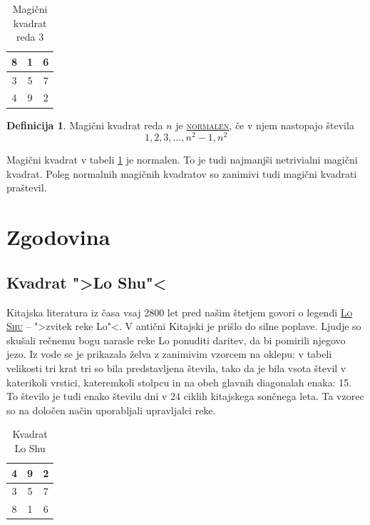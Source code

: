 \documentclass[a4paper,12pt]{article}
\newenvironment{magic}[3]
{
   \begin{table}[!ht]
      \centering
      \caption{#2}
      \label{#3}
      \large
      \begin{tabular}{#1}
         \hline 
}{
      \end{tabular}
      \normalsize
   \end{table}
}
\newcommand{\pojem}[1]{\underline{\textsc{#1}}}
\theoremstyle{definition}
\newtheorem{definicija}{Definicija}
\theoremstyle{definition}
\begin{document}
\begin{magic}{|c|c|c|}{Magični kvadrat reda 3}{MKreda3}
   8 & 1 & 6 \\\hline
   3 & 5 & 7 \\\hline
   4 & 9 & 2 \\\hline
\end{magic}

\begin{definicija}
   Magični kvadrat reda $ n $ je \pojem{normalen}, če v njem nastopajo števila
   \begin{equation}
      1,2,3,\dots,n^2 - 1,n^2
      \label{normalenKvad}
   \end{equation}
\end{definicija}

Magični kvadrat v tabeli \ref{MKreda3} je normalen.
To je tudi najmanjši netrivialni magični kvadrat.
Poleg normalnih magičnih kvadratov so zanimivi tudi magični kvadrati praštevil.


\section{Zgodovina}

\subsection{Kvadrat ">Lo Shu"<}

Kitajska literatura iz časa vsaj 2800 let pred našim štetjem govori o legendi
\pojem{Lo Shu} -- ">zvitek reke Lo"<. V antični Kitajski je prišlo do
silne poplave. Ljudje so skušali rečnemu bogu narasle reke Lo ponuditi daritev,
da bi pomirili njegovo jezo. Iz vode se je prikazala želva z zanimivim vzorcem
na oklepu: v tabeli velikosti tri krat tri so bila predstavljena števila, tako
da je bila vsota števil v katerikoli vrstici, kateremkoli stolpcu in na obeh
glavnih diagonalah enaka: 15. To število je tudi enako številu dni v 24 ciklih
kitajskega sončnega leta. Ta vzorec so na določen način uporabljali upravljalci
reke.

\begin{magic}{|c|c|c|}{Kvadrat Lo Shu}{KvadLo}
   4 & 9 & 2 \\\hline
   3 & 5 & 7 \\\hline
   8 & 1 & 6 \\\hline
\end{magic}
\end{document}

